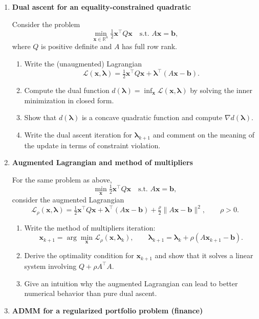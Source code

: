 \documentclass[11pt]{article}
\begin{document}
\begin{enumerate}
\bigskip
\item \textbf{Dual ascent for an equality-constrained quadratic}

Consider the problem
\[
\min_{\bm{x}\in\mathbb{R}^n} \tfrac{1}{2}\bm{x}^\top Q \bm{x}
\quad \text{s.t. } A\bm{x} = \bm{b},
\]
where $Q$ is positive definite and $A$ has full row rank.

\begin{enumerate}
\item Write the (unaugmented) Lagrangian
\[
\mathcal{L}(\bm{x},\bm{\lambda}) = \tfrac{1}{2}\bm{x}^\top Q \bm{x} + \bm{\lambda}^\top (A\bm{x}-\bm{b}).
\]
\item Compute the dual function $d(\bm{\lambda}) = \inf_{\bm{x}} \mathcal{L}(\bm{x},\bm{\lambda})$ by solving the inner minimization in closed form.
\item Show that $d(\bm{\lambda})$ is a concave quadratic function and compute $\nabla d(\bm{\lambda})$.
\item Write the dual ascent iteration for $\bm{\lambda}_{k+1}$ and comment on the meaning of the update in terms of constraint violation.
\end{enumerate}

\bigskip
\item \textbf{Augmented Lagrangian and method of multipliers}

For the same problem as above,
\[
\min_{\bm{x}} \tfrac{1}{2}\bm{x}^\top Q \bm{x} \quad \text{s.t. } A\bm{x} = \bm{b},
\]
consider the augmented Lagrangian
\[
\mathcal{L}_\rho(\bm{x},\bm{\lambda})
=
\tfrac{1}{2}\bm{x}^\top Q \bm{x}
+ \bm{\lambda}^\top (A\bm{x}-\bm{b})
+ \tfrac{\rho}{2}\|A\bm{x}-\bm{b}\|^2, \qquad \rho>0.
\]

\begin{enumerate}
\item Write the method of multipliers iteration:
\[
\bm{x}_{k+1} = \arg\min_{\bm{x}} \mathcal{L}_\rho(\bm{x},\bm{\lambda}_k),\qquad
\bm{\lambda}_{k+1} = \bm{\lambda}_k + \rho (A\bm{x}_{k+1}-\bm{b}).
\]
\item Derive the optimality condition for $\bm{x}_{k+1}$ and show that it solves a linear system involving $Q + \rho A^\top A$.
\item Give an intuition why the augmented Lagrangian can lead to better numerical behavior than pure dual ascent.
\end{enumerate}

\bigskip
\item \textbf{ADMM for a regularized portfolio problem (finance)}


\end{enumerate}
\end{document}
